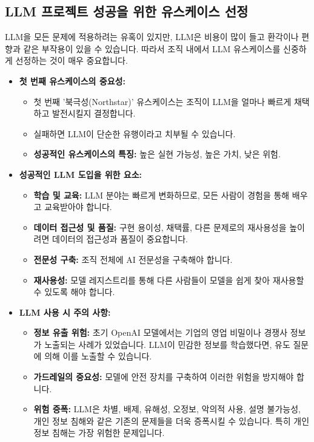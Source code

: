 \documentclass[11pt,a4paper]{article}
\theoremstyle{definition}
\begin{document}
\subsection{LLM 프로젝트 성공을 위한 유스케이스 선정}

LLM을 모든 문제에 적용하려는 유혹이 있지만, LLM은 비용이 많이 들고 환각이나 편향과 같은 부작용이 있을 수 있습니다. 따라서 조직 내에서 LLM 유스케이스를 신중하게 선정하는 것이 매우 중요합니다.

\begin{itemize}
    \item \textbf{첫 번째 유스케이스의 중요성:}
    \begin{itemize}
        \item 첫 번째 '북극성(Northstar)' 유스케이스는 조직이 LLM을 얼마나 빠르게 채택하고 발전시킬지 결정합니다.
        \item 실패하면 LLM이 단순한 유행이라고 치부될 수 있습니다.
        \item \textbf{성공적인 유스케이스의 특징:} 높은 실현 가능성, 높은 가치, 낮은 위험.
    \end{itemize}

    \item \textbf{성공적인 LLM 도입을 위한 요소:}
    \begin{itemize}
        \item \textbf{학습 및 교육:} LLM 분야는 빠르게 변화하므로, 모든 사람이 경험을 통해 배우고 교육받아야 합니다.
        \item \textbf{데이터 접근성 및 품질:} 구현 용이성, 채택률, 다른 문제로의 재사용성을 높이려면 데이터의 접근성과 품질이 중요합니다.
        \item \textbf{전문성 구축:} 조직 전체에 AI 전문성을 구축해야 합니다.
        \item \textbf{재사용성:} 모델 레지스트리를 통해 다른 사람들이 모델을 쉽게 찾아 재사용할 수 있도록 해야 합니다.
    \end{itemize}

    \item \textbf{LLM 사용 시 주의 사항:}
    \begin{itemize}
        \item \textbf{정보 유출 위험:} 초기 OpenAI 모델에서는 기업의 영업 비밀이나 경쟁사 정보가 노출되는 사례가 있었습니다. LLM이 민감한 정보를 학습했다면, 유도 질문에 의해 이를 노출할 수 있습니다.
        \item \textbf{가드레일의 중요성:} 모델에 안전 장치를 구축하여 이러한 위험을 방지해야 합니다.
        \item \textbf{위험 증폭:} LLM은 차별, 배제, 유해성, 오정보, 악의적 사용, 설명 불가능성, 개인 정보 침해와 같은 기존의 문제들을 더욱 증폭시킬 수 있습니다. 특히 개인 정보 침해는 가장 위험한 문제입니다.
    \end{itemize}
\end{itemize}
\end{document}
